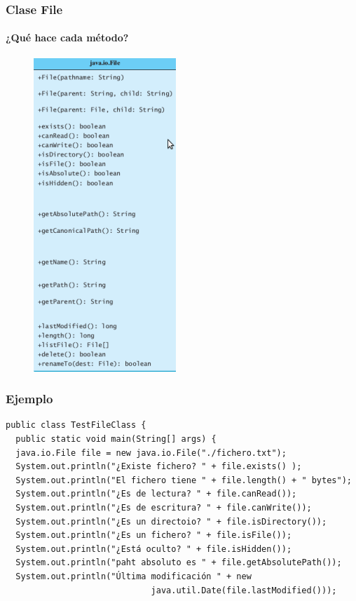 \documentclass{beamer}
\begin{document}
\begin{frame}[fragile]
\frametitle{Clase File}
\framesubtitle{¿Qué hace cada método?}
\begin{figure}
\includegraphics[scale=0.65]{imagenes/file.png}
\end{figure}
\end{frame}

\begin{frame}[fragile]
\frametitle{Ejemplo}
\begin{scriptsize}
\begin{verbatim}
public class TestFileClass {
  public static void main(String[] args) {
  java.io.File file = new java.io.File("./fichero.txt");
  System.out.println("¿Existe fichero? " + file.exists() );
  System.out.println("El fichero tiene " + file.length() + " bytes");
  System.out.println("¿Es de lectura? " + file.canRead());
  System.out.println("¿Es de escritura? " + file.canWrite());
  System.out.println("¿Es un directoio? " + file.isDirectory());
  System.out.println("¿Es un fichero? " + file.isFile());
  System.out.println("¿Está oculto? " + file.isHidden());
  System.out.println("paht absoluto es " + file.getAbsolutePath());
  System.out.println("Última modificación " + new
                             java.util.Date(file.lastModified()));
\end{verbatim}
\end{scriptsize}
\end{frame}
\end{document}
